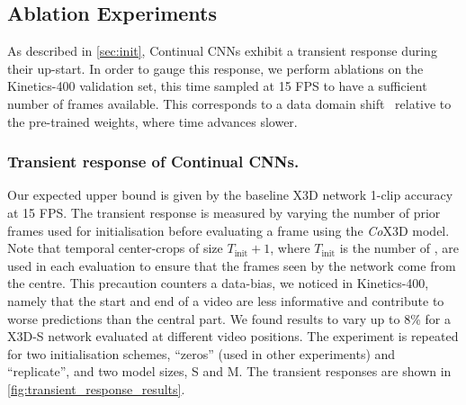 \renewcommand*{\thefootnote}{\arabic{footnote}}

\vspace{-3mm}
\subsection{Ablation Experiments}
\vspace{-1mm}
As described in \cref{sec:init}, Continual CNNs exhibit a transient response during their up-start.
In order to gauge this response, we perform ablations on the Kinetics-400 validation set, this time sampled at 15 FPS to have a sufficient number of frames available.
This corresponds to a data domain shift~\cite{wang2018deep} relative to the pre-trained weights, where time advances slower.

\vspace{-3mm}
\subsubsection{Transient response of Continual CNNs.} \label{sec:exp-transient}
Our expected upper bound is given by the baseline X3D network 1-clip accuracy at 15 FPS.
The transient response is measured by varying the number of prior frames used for initialisation before evaluating a frame using the \textit{Co}X3D model.
Note that temporal center-crops of size $T_{\text{init}} + 1$, where $T_{\text{init}}$ is the number of , are used in each evaluation to ensure that the frames seen by the network come from the centre. 
This precaution counters a data-bias, we noticed in Kinetics-400, namely that the start and end of a video are less informative and contribute to worse predictions than the central part. 
We found results to vary up to 8\% for a X3D-S network evaluated at different video positions.
The experiment is repeated for two initialisation schemes, ``zeros'' (used in other experiments) and ``replicate'', and two model sizes, S and M.
The transient responses are shown in \cref{fig:transient_response_results}.

